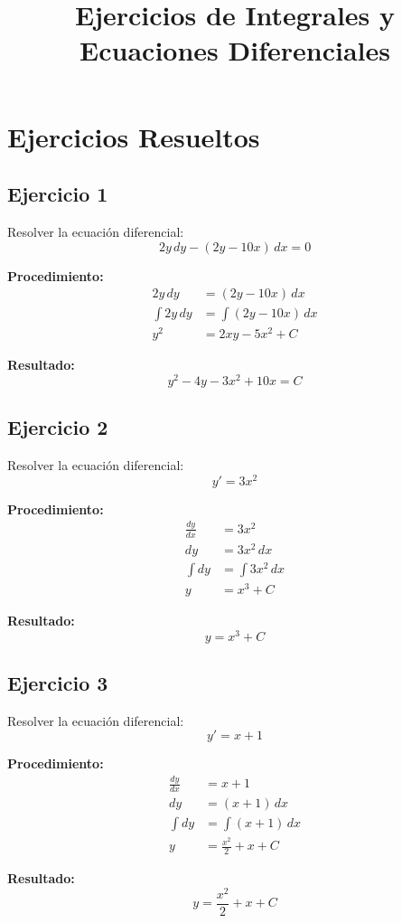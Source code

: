 \documentclass[12pt]{article}
\title{Ejercicios de Integrales y Ecuaciones Diferenciales}
\author{}
\date{}
\begin{document}
\maketitle

\section*{Ejercicios Resueltos}

\subsection*{Ejercicio 1}
Resolver la ecuación diferencial:
\[
2y\,dy - (2y - 10x)\,dx = 0
\]

\textbf{Procedimiento:}
\begin{align*}
2y\,dy &= (2y - 10x)\,dx \\
\int 2y\,dy &= \int (2y - 10x)\,dx \\
y^2 &= 2xy - 5x^2 + C
\end{align*}

\textbf{Resultado:}
\[
y^2 - 4y - 3x^2 + 10x = C
\]

\subsection*{Ejercicio 2}
Resolver la ecuación diferencial:
\[
y' = 3x^2
\]

\textbf{Procedimiento:}
\begin{align*}
\frac{dy}{dx} &= 3x^2 \\
dy &= 3x^2\,dx \\
\int dy &= \int 3x^2\,dx \\
y &= x^3 + C
\end{align*}

\textbf{Resultado:}
\[
y = x^3 + C
\]

\subsection*{Ejercicio 3}
Resolver la ecuación diferencial:
\[
y' = x + 1
\]

\textbf{Procedimiento:}
\begin{align*}
\frac{dy}{dx} &= x + 1 \\
dy &= (x + 1)\,dx \\
\int dy &= \int (x + 1)\,dx \\
y &= \frac{x^2}{2} + x + C
\end{align*}

\textbf{Resultado:}
\[
y = \frac{x^2}{2} + x + C
\]
\end{document}
